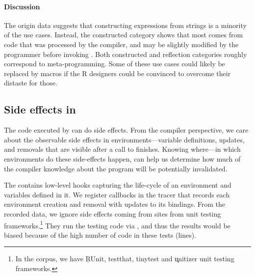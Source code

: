 \documentclass[review,screen,acmsmall,anonymous=true]{acmart}
\begin{document}
\paragraph{Discussion}

The origin data suggests that constructing expressions from strings is a
minority of the use cases. Instead, the constructed category shows that most \evals comes from code that was processed by the compiler, and may be
slightly modified by the programmer before invoking \eval. Both constructed and
reflection categories roughly correspond to meta-programming. Some of these use
cases could likely be replaced by macros if the R designers could be convinced
to overcome their distaste for those.

\subsection{Side effects in \eval}

The code executed by \eval can do side effects. From the compiler perspective,
we care about the observable side effects in environments---\ie variable
definitions, updates, and removals that are visible after a call to \eval
finishes. Knowing where---\ie in which environments do these side-effects
happen, can help us determine how much of the compiler knowledge about the
program will be potentially invalidated.

The \rdyntrace contains low-level hooks capturing the life-cycle of an
environment and variables defined in it. We register callbacks in the tracer
that records each environment creation and removal with updates to its
bindings. From the recorded data, we ignore side effects coming from \eval
sites from unit testing frameworks.\footnote{In the corpus, we have \c{RUnit,
testthat, tinytest} and \c{unitizer} unit testing frameworks.} They run the
testing code via \eval, and thus the results would be biased because of the
high number of code in these tests (\CranRunnableCodeTestsRnd lines).
\end{document}
